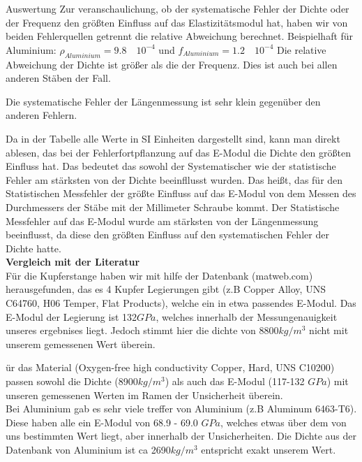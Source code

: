 \documentclass[twoside]{protokoll}
\begin{document}
\begin{aufgabe}{Auswertung}
Zur veranschaulichung, ob der systematische Fehler der Dichte oder der Frequenz den größten Einfluss auf das Elastizitätsmodul hat, haben wir von beiden Fehlerquellen getrennt die relative Abweichung berechnet.
Beispielhaft für Aluminium:
$ \rho_{Aluminium} = 9.8 \quad 10^{-4} $ und $ f_{Aluminium} = 1.2 \quad 10^{-4} $
Die relative Abweichung der Dichte ist größer als die der Frequenz. Dies ist auch bei allen anderen Stäben der Fall.

Die systematische Fehler der Längenmessung ist sehr klein gegenüber den anderen Fehlern.

Da in der Tabelle alle Werte in SI Einheiten dargestellt sind, kann man direkt ablesen,
das bei der Fehlerfortpflanzung auf das E-Modul die Dichte den größten Einfluss hat. 
Das bedeutet das sowohl der Systematischer wie der statistische Fehler am stärksten von der Dichte beeinfllusst wurden.
Das heißt, das für den Statistischen Messfehler der größte Einfluss auf das E-Modul von dem Messen des Durchmessers der Stäbe mit der Millimeter Schraube kommt.
Der Statistische Messfehler auf das E-Modul wurde am stärksten von der Längenmessung beeinflusst, da diese den größten Einfluss auf den systematischen Fehler der Dichte hatte. \\
 
\textbf{Vergleich mit der Literatur} \\
Für die Kupferstange haben wir mit hilfe der Datenbank (matweb.com) herausgefunden, das es 4 Kupfer Legierungen gibt (z.B Copper Alloy, UNS C64760, H06 Temper, Flat Products), welche ein in etwa passendes E-Modul.
Das E-Modul der Legierung ist 132$GPa$, welches innerhalb der Messungenauigkeit unseres ergebnises liegt.
Jedoch stimmt hier die dichte von 8800$kg/m^3$ nicht mit unserem gemessenen Wert überein.
 
ür das Material (Oxygen-free high conductivity Copper, Hard, UNS C10200) passen sowohl die Dichte (8900$kg/m^3$) als auch das E-Modul (117-132 $GPa$) mit unseren gemessenen Werten im Ramen der Unsicherheit überein. \\
 
Bei Aluminium gab es sehr viele treffer von Aluminium (z.B Aluminum 6463-T6).
Diese haben alle ein E-Modul von 68.9 - 69.0 $GPa$, welches etwas über dem von uns bestimmten Wert liegt, aber innerhalb der Unsicherheiten.
Die Dichte aus der Datenbank von Aluminium ist ca 2690$kg/m^3$ entspricht exakt unserem Wert. \\
 

\end{aufgabe}
\end{document}
